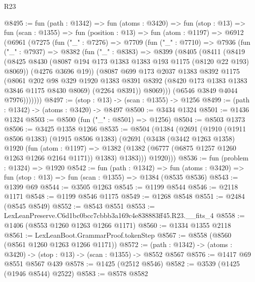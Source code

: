 \begin{lexlean}{R23}
\begin{coremodule}
@8495 := fun (path : @1342) =>
  fun (atoms : @3420) =>
  fun (stop : @13) =>
  fun (scan : @1355) =>
  fun (position : @13) =>
  fun (atom : @1197) =>
  @6912
    (@6961
      (@7275
        (fun ("_" : @7276) =>
        @7709
          (fun ("_" : @7710) =>
          @7936
            (fun ("_" : @7937) =>
            @8382
              (fun ("_" : @8383) =>
              @8399
                (@8405
                  (@8411
                    (@8419
                      (@8425 @8430 (@8087 @194 @173 @1383 @1383 @193 @1175 (@8120 @22 @193) @8069))
                      (@4276 @3696 @19))
                    (@8087
                      @699
                      @173
                      @2037
                      @1383
                      @8392
                      @1175
                      (@8061
                        @202
                        @98
                        @329
                        @1920
                        @1383
                        @8391
                        @8392
                        (@8420 @173 @1383 @1383 @3846 @1175 @8430 @8069)
                        (@2264 @8391))
                      @8069)))
                (@6546 @3849 @4044 @7976)))))))
@8497 := (stop : @13) -> (scan : @1355) -> @1256
@8499 := (path : @1342) -> (atoms : @3420) -> @8497
@8500 := @3434 @1324
@8501 := @1436 @1324
@8503 := @8500 (fun ("_" : @8501) => @1256)
@8504 := @8503 @1373
@8506 := @3425 @1358 @1266
@8535 := @8504
    (@1384
      (@2691
        (@1910
          (@1911 @8506 @1383)
          (@1915 @8506 @1383)
          (@2691
            (@3438
              (@3442 @1263 @1358)
              @1920
              (fun (atom : @1197) =>
              @1382 (@1382 (@6777 (@6875 @1257 @1260 @1263 @1266 @2164 @1171)) @1383) @1383)))
          @1920)))
@8536 := fun (problem : @1324) => @1920
@8542 := fun (path : @1342) =>
  fun (atoms : @3420) => fun (stop : @13) => fun (scan : @1355) => @1384 (@8535 @8536)
@8543 := @1399 @69
@8544 := @3505 @1263
@8545 := @1199 @8544
@8546 := @2118 @1171
@8548 := @1199 @8546 @1175
@8549 := @1268 @8548
@8551 := @2484 (@8545 @8549)
@8552 := @8543 @8551
@8553 := LexLeanPreserve.C6d1bc0bcc7cbbb3a169c4e838883ff45.R23.__fits_4
@8558 := @1406 (@8553 @1260 @1263 @1266 @1171)
@8560 := @1334 @1355 @2118
@8561 := LexLeanBoot.GrammarProof.tokenStep
@8567 := @8558 (@8560 (@8561 @1260 @1263 @1266 @1171))
@8572 := (path : @1342) -> (atoms : @3420) -> (stop : @13) -> (scan : @1355) -> @8552 @8567
@8576 := @1417 @69 @8551 @8567 @439
@8578 := @1425 (@2512 @8546)
@8582 := @3539 (@1425 (@1946 @8544) @2522)
@8583 := @8578 @8582

\end{coremodule}
\end{lexlean}

